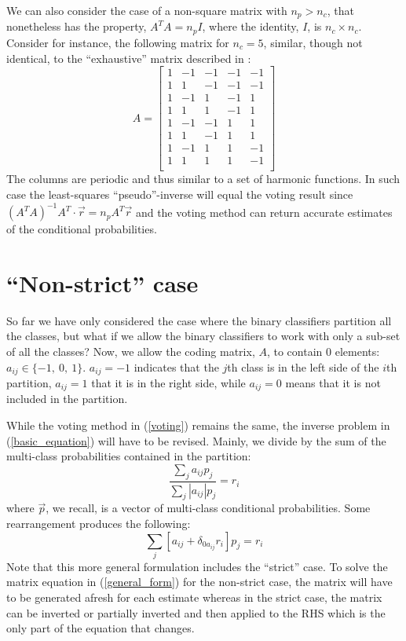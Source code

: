 \documentclass{article}
\begin{document}
We can also consider the case of a non-square matrix with $n_p > n_c$,
that nonetheless has the property, $A^T A = n_p I$, where the
identity, $I$, is $n_c \times n_c$. Consider for instance, 
the following matrix for $n_c=5$, 
similar, though not identical, to the ``exhaustive''
matrix described in \citet{Dietterich_Bakiri1995}:
\begin{equation}
  A = 
  \begin{bmatrix}
    1 & -1 & -1 & -1 & -1 \\
    1 &  1 & -1 & -1 & -1 \\
    1 & -1 &  1 & -1 &  1 \\
    1 &  1 &  1 & -1 &  1 \\
    1 & -1 & -1 &  1 &  1 \\
    1 &  1 & -1 &  1 &  1 \\
    1 & -1 &  1 &  1 & -1 \\
    1 &  1 &  1 &  1 & -1 \\
  \end{bmatrix}
\end{equation}
The columns are periodic and thus similar to a set of harmonic functions.
In such case the least-squares ``pseudo''-inverse will equal the voting result
since $(A^T A)^{-1} A^T \cdot \vec r = n_p A^T \vec r$ and the voting method
can return accurate estimates of the conditional probabilities.

\section{``Non-strict'' case}

\label{non_strict}

So far we have only considered the case where the binary classifiers partition
all the classes, but what if we allow the binary classifiers to work with only
a sub-set of all the classes? Now, we allow the coding matrix, $A$, to 
contain $0$ elements: $a_{ij} \in \lbrace -1,~0,~1 \rbrace$. 
$a_{ij}=-1$ indicates that the $j$th class is in the left side of
the $i$th partition, $a_{ij}=1$ that it is in the right side, 
while $a_{ij}=0$ means that it is not included in the partition. 

While the voting method in (\ref{voting}) remains the 
same, the inverse problem in (\ref{basic_equation}) will have to be revised. 
Mainly, we divide
by the sum of the multi-class probabilities contained in the partition:
\begin{equation}
	\frac{\sum_j a_{ij} p_j}{\sum_j |a_{ij}| p_j} = r_i
\end{equation}
where $\vec p$, we recall, is a vector of multi-class conditional probabilities. 
Some rearrangement produces the following:
\begin{equation}
	\sum_j \left [a_{ij} + \delta_{0a_{ij}} r_i \right ] p_j = r_i
	\label{general_form}
\end{equation}
Note that this more general formulation includes the ``strict'' case.
To solve the matrix equation in (\ref{general_form}) for the non-strict case, 
the matrix will have to be generated afresh for each estimate
whereas in the strict case, the matrix can be inverted or partially inverted
and then applied to the RHS which is the only part of the equation that
changes.
\end{document}
